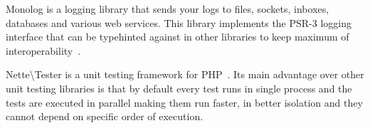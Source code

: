  \label{sec:theory:monolog}

Monolog is a logging library that sends your logs to files, sockets, inboxes, databases and various web services. This library implements the PSR-3 logging interface that can be typehinted against in other libraries to keep maximum of interoperability~\cite{monolog:readme}.

 \label{sec:theory:nette-tester}

Nette\textbackslash{}Tester is a unit testing framework for PHP~\cite{tester:docs}. Its main advantage over other unit testing libraries is that by default every test runs in single process and the tests are executed in parallel making them run faster, in better isolation and they cannot depend on specific order of execution.
